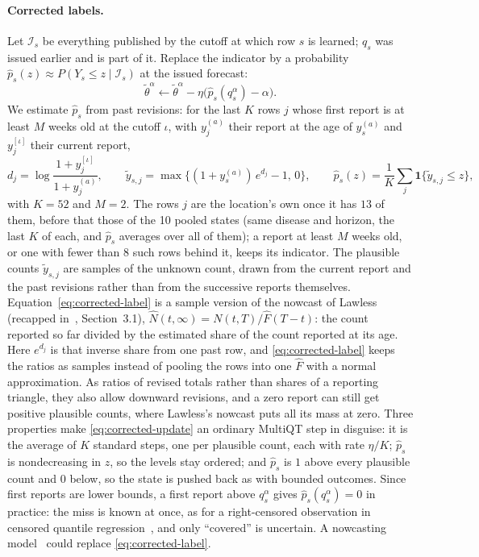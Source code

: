 \documentclass[11pt,a4paper]{article}
\newcommand{\ind}{\mathbf{1}}
\theoremstyle{definition}
\theoremstyle{remark}
\begin{document}
\paragraph{Corrected labels.} Let $\mathcal I_s$ be everything published
by the cutoff at which row $s$ is learned; $q_s$ was issued earlier and is
part of it. Replace the indicator by a probability
$\hat p_s(z)\approx P(Y_s\le z\mid\mathcal I_s)$ at the issued forecast:
\begin{equation}
 \tilde\theta^\alpha\leftarrow\tilde\theta^\alpha
 -\eta\bigl(\hat p_s(q_s^\alpha)-\alpha\bigr).
 \label{eq:corrected-update}
\end{equation}
We estimate $\hat p_s$ from past revisions: for the last $K$ rows $j$
whose first report is at least $M$ weeks old at the cutoff $\iota$, with
$y_j^{(a)}$ their report at the age of $y_s^{(a)}$ and $y_j^{[\iota]}$
their current report,
\begin{equation}
 d_j=\log\frac{1+y_j^{[\iota]}}{1+y_j^{(a)}},\qquad
 \tilde y_{s,j}=\max\bigl\{(1+y_s^{(a)})\,e^{d_j}-1,\,0\bigr\},\qquad
 \hat p_s(z)=\frac1K\sum_j\ind\{\tilde y_{s,j}\le z\},
 \label{eq:corrected-label}
\end{equation}
with $K=52$ and $M=2$. The rows $j$ are the location's own once it has
$13$ of them, before that those of the 10 pooled states (same disease and
horizon, the last $K$ of each, and $\hat p_s$ averages over all of them);
a report at least $M$ weeks old, or one with fewer than $8$ such rows
behind it, keeps its indicator. The plausible
counts $\tilde y_{s,j}$ are samples of the unknown count, drawn from the
current report and the past revisions rather than from the successive
reports themselves. Equation~\eqref{eq:corrected-label} is a sample
version of the nowcast of Lawless~\cite{lawless} (recapped
in~\cite{hoehle-nowcasting}, Section~3.1),
$\hat N(t,\infty)=N(t,T)/\hat F(T-t)$: the count reported so far divided
by the estimated share of the count reported at its age. Here $e^{d_j}$ is
that inverse share from one past row, and \eqref{eq:corrected-label} keeps
the ratios as samples instead of pooling the rows into one $\hat F$ with a
normal approximation. As ratios of revised totals rather than shares of a
reporting triangle, they also allow downward revisions, and a zero report
can still get positive plausible counts, where Lawless's nowcast puts all
its mass at zero. Three properties make \eqref{eq:corrected-update} an ordinary
MultiQT step in disguise: it is the average of $K$ standard steps, one per
plausible count, each with rate $\eta/K$; $\hat p_s$ is nondecreasing in
$z$, so the levels stay ordered; and $\hat p_s$ is $1$ above every
plausible count and $0$ below, so the state is pushed back as with bounded
outcomes. Since first reports are lower bounds, a first report above
$q_s^\alpha$ gives $\hat p_s(q_s^\alpha)=0$ in practice: the miss is known
at once, as for a right-censored observation in censored quantile
regression~\cite{portnoy}, and only ``covered'' is uncertain. A nowcasting
model~\cite{hoehle-nowcasting,nobbs} could replace
\eqref{eq:corrected-label}.
\end{document}
